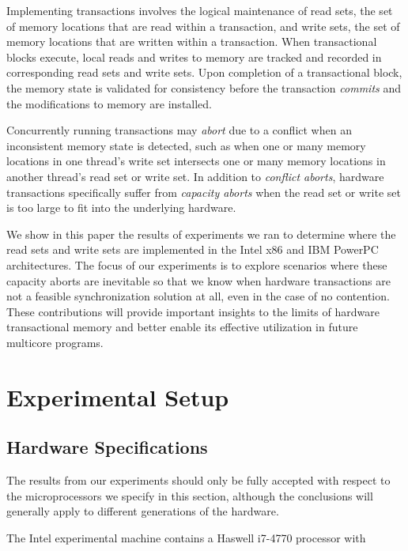 \documentclass{article}
\begin{document}
Implementing transactions involves the logical maintenance of read sets, the set
of memory locations that are read within a transaction, and write sets, the set
of memory locations that are written within a transaction. When transactional
blocks execute, local reads and writes to memory are tracked and recorded in
corresponding read sets and write sets. Upon completion of a transactional
block, the memory state is validated for consistency before the transaction
\textit{commits} and the modifications to memory are installed.

Concurrently running transactions may \textit{abort} due to a conflict when an
inconsistent memory state is detected, such as when one or many memory locations
in one thread's write set intersects one or many memory locations in another
thread's read set or write set. In addition to \textit{conflict aborts},
hardware transactions specifically suffer from \textit{capacity aborts} when the
read set or write set is too large to fit into the underlying hardware.

We show in this paper the results of experiments we ran to determine where the
read sets and write sets are implemented in the Intel x86 and IBM PowerPC
architectures. The focus of our experiments is to explore scenarios where these
capacity aborts are inevitable so that we know when hardware transactions are
not a feasible synchronization solution at all, even in the case of no
contention. These contributions will provide important insights to the limits of
hardware transactional memory and better enable its effective utilization in
future multicore programs.

\section{Experimental Setup}
\subsection{Hardware Specifications}
The results from our experiments should only be fully accepted with respect to
the microprocessors we specify in this section, although the conclusions will
generally apply to different generations of the hardware.

The Intel experimental machine contains a Haswell i7-4770 processor with
\end{document}
